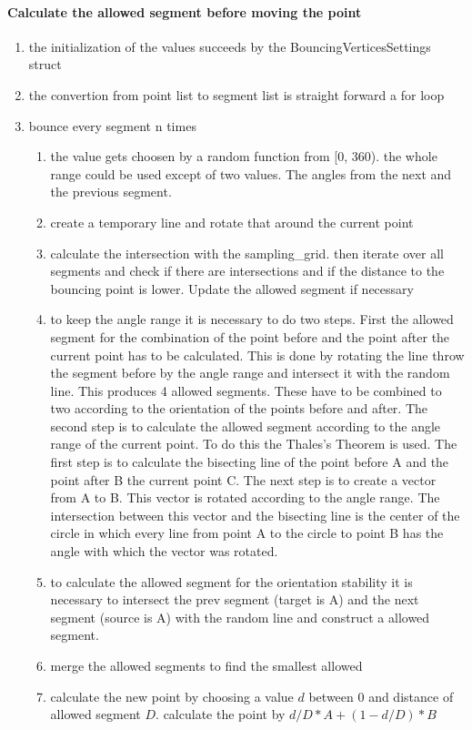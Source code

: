 \paragraph{Calculate the allowed segment before moving the point}
\begin{enumerate}
  \item the initialization of the values succeeds by the
    BouncingVerticesSettings struct
  \item the convertion from point list to segment list is straight
    forward a for loop
  \item bounce every segment n times
  \begin{enumerate}
    \item the value gets choosen by a random function from [0, 360).
      the whole range could be used except of two values. The angles
      from the next and the previous segment.
    \item create a temporary line and rotate that around the current point
    \item calculate the intersection with the sampling\_grid. then iterate over
      all segments and check if there are intersections and if the distance to
      the bouncing point is lower. Update the allowed segment if necessary
    \item to keep the angle range it is necessary to do two steps. First the
      allowed segment for the combination of the point before and the point
      after the current point has to be calculated. This is done by rotating the
      line throw the segment before by the angle range and intersect it with the
      random line. This produces 4 allowed segments. These have to be combined
      to two according to the orientation of the points before and after. The
      second step is to calculate the allowed segment according to the angle
      range of the current point. To do this the Thales's Theorem is used. The
      first step is to calculate the bisecting line of the point before A and the
      point after B the current point C. The next step is to create a vector
      from A to B. This vector is rotated according to the angle range. The
      intersection between this vector and the bisecting line is the center of
      the circle in which every line from point A to the circle to point B has
      the angle with which the vector was rotated.
    \item to calculate the allowed segment for the orientation stability it is
      necessary to intersect the prev segment (target is A) and the next segment
      (source is A) with the random line and construct a allowed segment.
    \item merge the allowed segments to find the smallest allowed
    \item calculate the new point by choosing a value $d$ between 0 and distance of
      allowed segment $D$. calculate the point by $d/D * A + (1-d/D) * B$
  \end{enumerate}
\end{enumerate}


